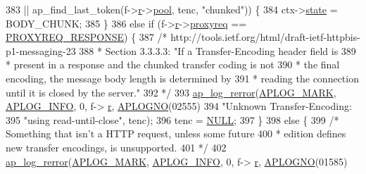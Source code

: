 \begin{DoxyCode}
383                     || ap\_find\_last\_token(f->\hyperlink{structap__filter__t_a2d6537780c4059697c1f168a1121d62c}{r}->\hyperlink{structrequest__rec_aa0a0c16f9a9ab3901cdb3f3c9c9d83d0}{pool}, tenc, \textcolor{stringliteral}{"chunked"})) \{
384                 ctx->\hyperlink{structhttp__filter__ctx_a2e84a1c737dd4daa565b328c875402cb}{state} = BODY\_CHUNK;
385             \}
386             \textcolor{keywordflow}{else} \textcolor{keywordflow}{if} (f->\hyperlink{structap__filter__t_a2d6537780c4059697c1f168a1121d62c}{r}->\hyperlink{structrequest__rec_a82ca03c6dcfcacbf7001ff85e462289d}{proxyreq} == \hyperlink{group__ProxyReq_gaedfe04be933e20251ce580aa6b15d864}{PROXYREQ\_RESPONSE}) \{
387                 \textcolor{comment}{/* http://tools.ietf.org/html/draft-ietf-httpbis-p1-messaging-23}
388 \textcolor{comment}{                 * Section 3.3.3.3: "If a Transfer-Encoding header field is}
389 \textcolor{comment}{                 * present in a response and the chunked transfer coding is not}
390 \textcolor{comment}{                 * the final encoding, the message body length is determined by}
391 \textcolor{comment}{                 * reading the connection until it is closed by the server."}
392 \textcolor{comment}{                 */}
393                 \hyperlink{group__APACHE__CORE__LOG_ga4c112558ccffd6b363da102b2052d2a6}{ap\_log\_rerror}(\hyperlink{group__APACHE__CORE__LOG_ga655e126996849bcb82e4e5a14c616f4a}{APLOG\_MARK}, \hyperlink{group__APACHE__CORE__LOG_ga47fafbef7e478babdd92e90407f95b19}{APLOG\_INFO}, 0, f->
      \hyperlink{structap__filter__t_a2d6537780c4059697c1f168a1121d62c}{r}, \hyperlink{group__APACHE__CORE__LOG_ga1dee8a07e06bc5b3de8b89662c2cd666}{APLOGNO}(02555)
394                               \textcolor{stringliteral}{"Unknown Transfer-Encoding: %
395                               \textcolor{stringliteral}{"using read-until-close"}, tenc);
396                 tenc = \hyperlink{pcre_8txt_ad7f989d16aa8ca809a36bc392c07fba1}{NULL};
397             \}
398             \textcolor{keywordflow}{else} \{
399                 \textcolor{comment}{/* Something that isn't a HTTP request, unless some future}
400 \textcolor{comment}{                 * edition defines new transfer encodings, is unsupported.}
401 \textcolor{comment}{                 */}
402                 \hyperlink{group__APACHE__CORE__LOG_ga4c112558ccffd6b363da102b2052d2a6}{ap\_log\_rerror}(\hyperlink{group__APACHE__CORE__LOG_ga655e126996849bcb82e4e5a14c616f4a}{APLOG\_MARK}, \hyperlink{group__APACHE__CORE__LOG_ga47fafbef7e478babdd92e90407f95b19}{APLOG\_INFO}, 0, f->
      \hyperlink{structap__filter__t_a2d6537780c4059697c1f168a1121d62c}{r}, \hyperlink{group__APACHE__CORE__LOG_ga1dee8a07e06bc5b3de8b89662c2cd666}{APLOGNO}(01585)
}
\end{DoxyCode}
